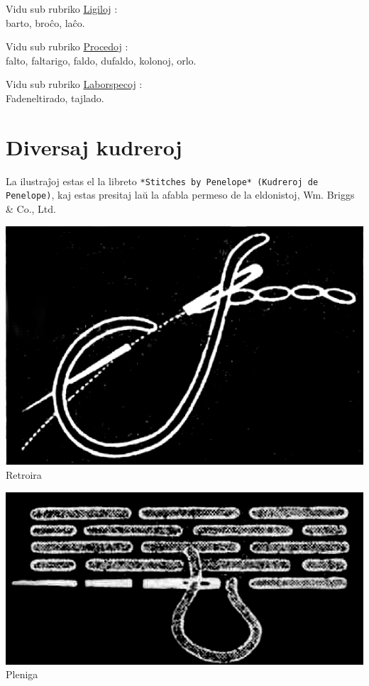 Vidu sub rubriko \hyperlink{Ligiloj}{Ligiloj} :\\
barto, broĉo, laĉo.

Vidu sub rubriko \hyperlink{Procedoj}{Procedoj} :\\
falto, faltarigo, faldo, dufaldo, kolonoj, orlo.

Vidu sub rubriko \hyperlink{Laborspecoj}{Laborspecoj} :\\
Fadeneltirado, tajlado.

\section[Diversaj kudreroj]{Diversaj kudreroj}
\hypertarget{Diversaj kudreroj}{}
\label{Diversaj kudreroj}


La ilustraĵoj estas el la libreto \texttt{*Stitches by Penelope* (Kudreroj de Penelope)}, kaj estas presitaj laŭ la afabla permeso de la eldonistoj, Wm. Briggs \& Co., Ltd.

\begin{center}\includegraphics[keepaspectratio,width=\textwidth,height=0.75\textheight]{1.png}\\
Retroira\end{center}

\begin{center}\includegraphics[keepaspectratio,width=\textwidth,height=0.75\textheight]{2.png}\\
Pleniga\end{center}

